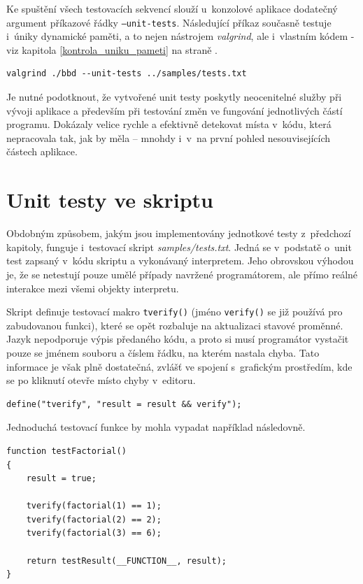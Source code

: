 \documentclass[11pt,twoside,a4paper]{book}
\begin{document}
Ke spuštění všech testovacích sekvencí slouží u~konzolové aplikace dodatečný argument pří\-ka\-zo\-vé řádky \texttt{--unit-tests}. Následující příkaz současně testuje i~úniky dynamické paměti, a to nejen nástrojem \textit{valgrind}, ale i~vlastním kódem - viz kapitola \ref{kontrola_uniku_pameti} na straně \pageref{kontrola_uniku_pameti}.

\begin{verbatim}
valgrind ./bbd --unit-tests ../samples/tests.txt
\end{verbatim}

Je nutné podotknout, že vytvořené unit testy poskytly neocenitelné služby při vývoji aplikace a především při testování změn ve fungování jednotlivých částí programu. Dokázaly velice rychle a efektivně detekovat místa v~kódu, která nepracovala tak, jak by měla -- mnohdy i~v~na první pohled nesouvisejících částech aplikace.


\section{Unit testy ve skriptu}

Obdobným způsobem, jakým jsou implementovány jednotkové testy z~předchozí kapitoly, funguje i~testovací skript \textit{samples/tests.txt}. Jedná se v~podstatě o~unit test zapsaný v~kódu skriptu a vykonávaný interpretem. Jeho obrovskou výhodou je, že se netestují pouze umělé případy navržené programátorem, ale přímo reálné interakce mezi všemi objekty interpretu.

Skript definuje testovací makro \texttt{tverify()} (jméno \texttt{verify()} se již používá pro zabudovanou funkci), které se opět rozbaluje na aktualizaci stavové proměnné. Jazyk nepodporuje výpis předaného kódu, a proto si musí programátor vystačit pouze se jménem souboru a číslem řádku, na kterém nastala chyba. Tato informace je však plně dostatečná, zvlášť ve spojení s~grafickým prostředím, kde se po kliknutí otevře místo chyby v~editoru.

\begin{verbatim}
define("tverify", "result = result && verify");
\end{verbatim}

Jednoduchá testovací funkce by mohla vypadat například následovně.

\begin{verbatim}
function testFactorial()
{
    result = true;

    tverify(factorial(1) == 1);
    tverify(factorial(2) == 2);
    tverify(factorial(3) == 6);

    return testResult(__FUNCTION__, result);
}
\end{verbatim}
\end{document}
